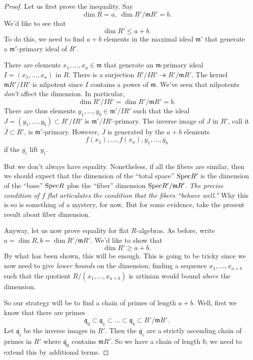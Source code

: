 \begin{proof} 
Let us first prove the inequality. Say $$\dim R = a,  \ \dim R'/\mathfrak{m}R'
= b.$$ We'd like to see that
\[ \dim R' \leq a+b.  \]
To do this, we need to find $a+b$ elements in the maximal ideal $\mathfrak{m}'$
that generate a $\mathfrak{m}'$-primary ideal of $R'$. 

There are elements $x_1, \dots, x_a \in \mathfrak{m}$ that generate an
$\mathfrak{m}$-primary ideal $I = (x_1, \dots, x_a)$ in $R$. There is a surjection $R'/I R'
\twoheadrightarrow R'/\mathfrak{m}R'$.
The kernel $\mathfrak{m}R'/IR'$ is nilpotent since $I$ contains a power of
$\mathfrak{m}$. 	We've seen that nilpotents \emph{don't} affect the dimension.
In particular, 
\[ \dim R'/IR' = \dim R'/\mathfrak{m}R' = b.  \]
There are thus elements $y_1, \dots, y_b \in \mathfrak{m}'/IR'$ such that the
ideal $J = (y_1, \dots, y_b) \subset R'/I R'$ is $\mathfrak{m}'/IR'$-primary.
The inverse image of $J$ in $R'$, call it $\overline{J} \subset R'$, is
$\mathfrak{m}'$-primary. However, $\overline{J}$ is generated by the $a+b$
elements
\[ f(x_1), \dots, f(x_a), \overline{y_1}, \dots, \overline{y_b}  \]
if the $\overline{y_i}$ lift $y_i$. 

But we don't always have equality. Nonetheless, if all the fibers are similar,
then we should expect that the dimension of the ``total space'' $\mathrm{Spec} R'$ is
the dimension of the ``base'' $\mathrm{Spec} R$ plus the ``fiber'' dimension $\mathrm{Spec}
R'/\mathfrak{m}R'$.  
\emph{The precise condition of $f$ flat articulates the condition that the fibers
 ``behave well.'' }
Why this is so is something of a mystery, for now.
But for some evidence, take the present result about fiber dimension.

Anyway, let us now prove equality for flat $R$-algebras. As before, write $a =
\dim R, b = \dim R'/\mathfrak{m}R'$. We'd like to show that
\[ \dim R' \geq a+b.  \]
By what has been shown, this will be enough.
This is going to be tricky since we now need to give \emph{lower bounds} on the
dimension; finding a sequence $x_{1}, \dots, x_{a+b}$ such that the quotient
$R/(x_1, \dots, x_{a+b})$ is artinian would bound \emph{above} the dimension.

So our strategy will be to find a chain of primes of length $a+b$. Well, first
we know that there are primes
\[ \mathfrak{q}_0 \subset \mathfrak{q}_1 \subset \dots \subset \mathfrak{q}_b
\subset R'/\mathfrak{m}R'.  \]
Let $\overline{\mathfrak{q}_i}$ be the inverse images in $R'$. Then the
$\overline{\mathfrak{q}_i}$ are a strictly ascending chain of primes in $R'$ where
$\overline{\mathfrak{q}_0}$ contains $\mathfrak{m}R'$. So we have a chain of
length $b$; we need to extend this by additional terms.


\end{proof}

